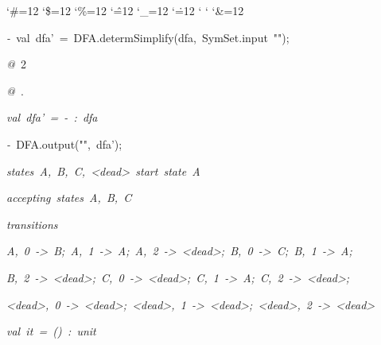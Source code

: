 \begin{list}{}
{\setlength{\leftmargin}{\leftmargini}
\setlength{\rightmargin}{0cm}
\setlength{\itemindent}{0cm}
\setlength{\listparindent}{0cm}
\setlength{\itemsep}{0cm}
\setlength{\parsep}{0cm}
\setlength{\labelsep}{0cm}
\setlength{\labelwidth}{0cm}
\catcode`\#=12
\catcode`\$=12
\catcode`\%=12
\catcode`\^=12
\catcode`\_=12
\catcode`\.=12
\catcode`
\catcode`
\catcode`\&=12
\ttfamily}
\small
\item[]\textsl{-\ }val\ dfa'\ =\ DFA.determSimplify(dfa,\ SymSet.input\ "");
\item[]\textsl{@\ }2
\item[]\textsl{@\ }.
\item[]\textsl{val\ dfa'\ =\ -\ :\ dfa}
\item[]\textsl{-\ }DFA.output("",\ dfa');
\item[]\textsl{states\ A,\ B,\ C,\ <dead>\ start\ state\ A}
\item[]\textsl{accepting\ states\ A,\ B,\ C}
\item[]\textsl{transitions}
\item[]\textsl{A,\ 0\ ->\ B;\ A,\ 1\ ->\ A;\ A,\ 2\ ->\ <dead>;\ B,\ 0\ ->\ C;\ B,\ 1\ ->\ A;}
\item[]\textsl{B,\ 2\ ->\ <dead>;\ C,\ 0\ ->\ <dead>;\ C,\ 1\ ->\ A;\ C,\ 2\ ->\ <dead>;}
\item[]\textsl{<dead>,\ 0\ ->\ <dead>;\ <dead>,\ 1\ ->\ <dead>;\ <dead>,\ 2\ ->\ <dead>}
\item[]\textsl{val\ it\ =\ ()\ :\ unit}
\end{list}
